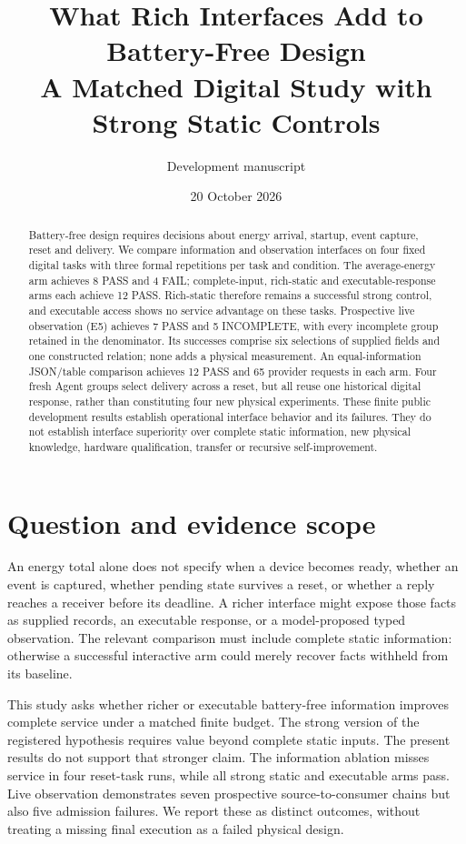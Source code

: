 \documentclass[10pt]{article}
\title{What Rich Interfaces Add to Battery-Free Design\\A Matched Digital Study with Strong Static Controls}
\author{Development manuscript}
\date{20 October 2026}
\begin{document}
\maketitle
\begin{abstract}
Battery-free design requires decisions about energy arrival, startup, event
capture, reset and delivery. We compare information and observation interfaces
on four fixed digital tasks with three formal repetitions per task and condition.
The average-energy arm achieves 8 PASS and 4 FAIL; complete-input, rich-static
and executable-response arms each achieve 12 PASS. Rich-static therefore remains
a successful strong control, and executable access shows no service advantage
on these tasks. Prospective live observation (E5) achieves 7 PASS and 5 INCOMPLETE,
with every incomplete group retained in the denominator. Its successes comprise
six selections of supplied fields and one constructed relation; none adds a
physical measurement. An equal-information JSON/table comparison achieves
12 PASS and 65 provider requests in each arm. Four fresh Agent groups select
delivery across a reset, but all reuse one historical digital response, rather
than constituting four new physical experiments. These finite public development
results establish operational interface behavior and its failures. They do not
establish interface superiority over complete static information, new physical
knowledge, hardware qualification, transfer or recursive self-improvement.
\end{abstract}

\section{Question and evidence scope}
An energy total alone does not specify when a device becomes ready, whether an
event is captured, whether pending state survives a reset, or whether a reply
reaches a receiver before its deadline. A richer interface might expose those
facts as supplied records, an executable response, or a model-proposed typed
observation. The relevant comparison must include complete static information:
otherwise a successful interactive arm could merely recover facts withheld
from its baseline.

This study asks whether richer or executable battery-free information improves
complete service under a matched finite budget. The strong version of the
registered hypothesis requires value beyond complete static inputs. The present
results do not support that stronger claim. The information ablation misses
service in four reset-task runs, while all strong static and executable arms
pass. Live observation demonstrates seven prospective source-to-consumer
chains but also five admission failures. We report these as distinct outcomes,
without treating a missing final execution as a failed physical design.
\end{document}
